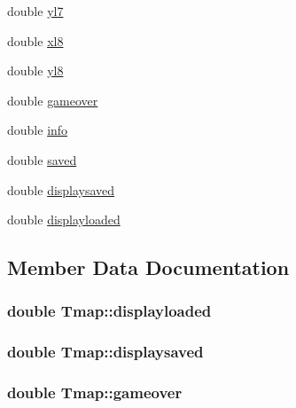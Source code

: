 \begin{DoxyCompactItemize}
\item 
double \hyperlink{struct_tmap_a096b97170b08fa99f2692695a6775e35}{yl7}
\item 
double \hyperlink{struct_tmap_a6d8cf78e50c3630a4e9a31602a227902}{xl8}
\item 
double \hyperlink{struct_tmap_aedd27b113a1e4f091ccbba9c6d8c3237}{yl8}
\item 
double \hyperlink{struct_tmap_ab08a0a58d40529220e9c122d35e3f395}{gameover}
\item 
double \hyperlink{struct_tmap_a80a5c7085f7bc0ecb2156602f3fd3662}{info}
\item 
double \hyperlink{struct_tmap_addbcb577f2504301ea95bb53ea006dbb}{saved}
\item 
double \hyperlink{struct_tmap_aa75b36544276140ca72c08689fb06de1}{displaysaved}
\item 
double \hyperlink{struct_tmap_aa96f6aeb164983d14457570ec5170b02}{displayloaded}
\end{DoxyCompactItemize}


\subsection{Member Data Documentation}
\subsubsection[{\texorpdfstring{displayloaded}{displayloaded}}]{\setlength{\rightskip}{0pt plus 5cm}double Tmap\+::displayloaded}\hypertarget{struct_tmap_aa96f6aeb164983d14457570ec5170b02}{}\label{struct_tmap_aa96f6aeb164983d14457570ec5170b02}
\subsubsection[{\texorpdfstring{displaysaved}{displaysaved}}]{\setlength{\rightskip}{0pt plus 5cm}double Tmap\+::displaysaved}\hypertarget{struct_tmap_aa75b36544276140ca72c08689fb06de1}{}\label{struct_tmap_aa75b36544276140ca72c08689fb06de1}
\subsubsection[{\texorpdfstring{gameover}{gameover}}]{\setlength{\rightskip}{0pt plus 5cm}double Tmap\+::gameover}\hypertarget{struct_tmap_ab08a0a58d40529220e9c122d35e3f395}{}\label{struct_tmap_ab08a0a58d40529220e9c122d35e3f395}
